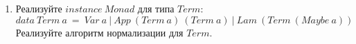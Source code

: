 \documentclass[draft]{article}
\begin{document}
\begin{enumerate}
\item Реализуйте $\mathit{instance}\ \mathit{Monad}$ для типа $\mathit{Term}$:
\[ \mathit{data}\ \mathit{Term}\ a\ =\ \mathit{Var}\ a\ |\ \mathit{App}\ (\mathit{Term}\ a)\ (\mathit{Term}\ a)\ |\ \mathit{Lam}\ (\mathit{Term}\ (\mathit{Maybe}\ a)) \]
Реализуйте алгоритм нормализации для $\mathit{Term}$.

\end{enumerate}
\end{document}
